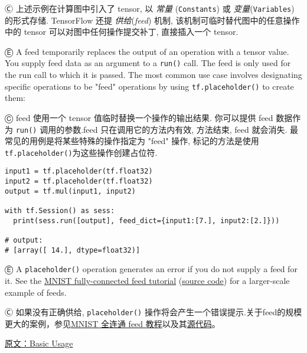 Ⓒ 上述示例在计算图中引入了 tensor, 以 \emph{常量} (\lstinline{Constants}) 或 \emph{变量}(\lstinline{Variables}) 的形式存储. TensorFlow 还提 \emph{供给}(\emph{feed}) 机制, 该机制可临时替代图中的任意操作中的 tensor 可以对图中任何操作提交补丁, 直接插入一个 tensor.

Ⓔ \textcolor{etc}{A feed temporarily replaces the output of an operation with a tensor value. You supply feed data as an argument to a \lstinline{run()} call. The feed is only used for the run call to which it is passed. The most common use case involves designating specific operations to be "feed" operations by using \lstinline{tf.placeholder()} to create them:}

Ⓒ feed 使用一个 tensor 值临时替换一个操作的输出结果. 你可以提供 feed 数据作为 \lstinline {run()} 调用的参数.feed 只在调用它的方法内有效, 方法结束, feed 就会消失. 最常见的用例是将某些特殊的操作指定为 "feed" 操作, 标记的方法是使用\lstinline{tf.placeholder()}为这些操作创建占位符.

\begin{lstlisting}
input1 = tf.placeholder(tf.float32)
input2 = tf.placeholder(tf.float32)
output = tf.mul(input1, input2)

with tf.Session() as sess:
  print(sess.run([output], feed_dict={input1:[7.], input2:[2.]}))

# output:
# [array([ 14.], dtype=float32)]
\end{lstlisting}

Ⓔ \textcolor{etc}{A \lstinline{placeholder()} operation generates an error if you do not supply a feed for it. See the \hyperref[minist_tf]{MNIST fully-connected feed tutorial} (\href{https://tensorflow.googlesource.com/tensorflow/+/master/tensorflow/g3doc/tutorials/mnist/fully_connected_feed.py}{source code}) for a larger-scale example of feeds.}

Ⓒ 如果没有正确供给, \lstinline{placeholder()} 操作将会产生一个错误提示.关于feed的规模更大的案例，参见\hyperref[minist_tf]{MNIST 全连通 feed 教程}以及其\href{https://tensorflow.googlesource.com/tensorflow/+/master/tensorflow/g3doc/tutorials/mnist/fully_connected_feed.py}{源代码}。

\href{http://tensorflow.org/get_started/basic_usage.md}{原文：Basic Usage}
